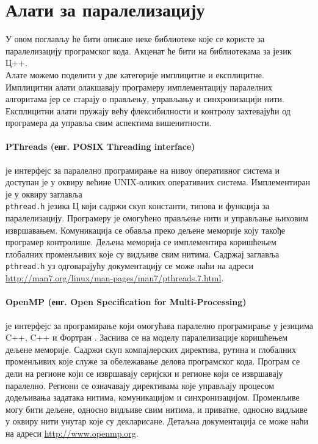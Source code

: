 \documentclass[12pt,oneside]{memoir}
\begin{document}
  \section{Алати за паралелизацију}
	У овом поглављу ће бити описане неке библиотеке које се користе за паралелизацију програмског кода. Акценат ће бити на библиотекама за језик Ц++. 
	\\ \indent Алате можемо поделити у две категорије имплицитне и експлицитне. Имплицитни алати олакшавају програмеру имплементацију паралелних алгоритама јер се старају о прављењу, управљању и синхронизацији нити. Експлицитни алати пружају већу флексибилности и контролу захтевајући од програмера да управља свим аспектима вишенитности.
	
\paragraph{ PThreads (енг. POSIX Threading interface)} је интерфејс за паралелно програмирање на нивоу оперативног система и доступан је у оквиру већине UNIX-оликих оперативних система. Имплементиран је у оквиру заглавља \\ \texttt{pthread.h} језика Ц који садржи скуп константи, типова и функција за паралелизацију. Програмеру је омогућено прављење нити и управљање њиховим извршавањем. Комуникација се обавља преко дељене меморије коју такође програмер контролише. Дељена меморија се имплементира коришћењем глобалних променљивих које су видљиве свим нитима. Садржај заглавља \texttt{pthread.h} уз одговарајућу документацију се може наћи на адреси \url{http://man7.org/linux/man-pages/man7/pthreads.7.html}.

\paragraph{OpenMP (енг. Open Specification for Multi-Processing)} је интерфејс за програмирање који омогућава паралелно програмирање у језицима C++, C++ и Фортран . Заснива се на моделу паралелизације коришћењем дељене меморије. Садржи скуп компајлерских директива, рутина и глобалних променљивих које служе за обележавање делова програмског кода. Програм се дели на регионе који се извршавају серијски и регионе који се извршавају паралелно. Региони се означавају директивама које управљају процесом додељивања задатака нитима, комуникацијом и синхронизацијом. Променљиве могу бити дељене, односно видљиве свим нитима, и приватне, односно видљиве у оквиру нити унутар које су декларисане. Детаљна документација се може наћи на адреси \url{http://www.openmp.org}. 
\end{document}
